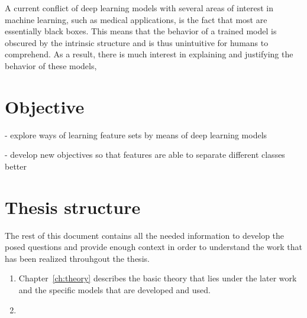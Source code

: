 A current conflict of deep learning models with several areas of interest in machine learning, such as medical applications, is the fact that most are essentially black boxes. This means that the behavior of a trained model is obscured by the intrinsic structure and is thus unintuitive for humans to comprehend. As a result, there is much interest in explaining and justifying the behavior of these models, 

\section{Objective}

- explore ways of learning feature sets by means of deep learning models

- develop new objectives so that features are able to separate different classes better

\section{Thesis structure}

The rest of this document contains all the needed information to develop the posed questions and provide enough context in order to understand the work that has been realized throuhgout the thesis.

\begin{enumerate}
    \item Chapter~\ref{ch:theory} describes the basic theory that lies under the later work and the specific models that are developed and used.
    \item {}
\end{enumerate}